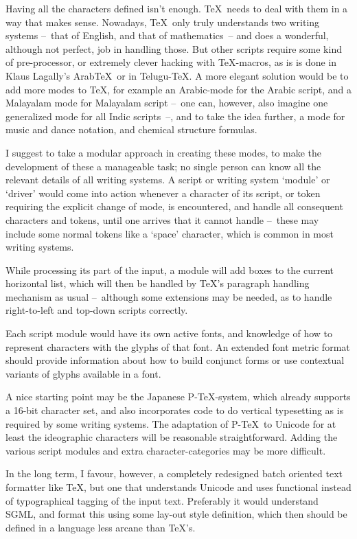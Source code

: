Having all the characters defined isn't enough. \TeX\ needs to deal
with them in a way that makes sense. Nowadays, \TeX\ only truly
understands two writing systems --~that of English, and that of
mathematics~-- and does a wonderful, although not perfect, job in
handling those. But other scripts require some kind of pre-processor,
or extremely clever hacking with \TeX-macros, as is is done in Klaus
Lagally's Arab\TeX\ or in Telugu-\TeX. A more elegant solution would
be to add more modes to \TeX, for example an Arabic-mode for the
Arabic script, and a Malayalam mode for Malayalam script --~one can,
however, also imagine one generalized mode for all Indic scripts~--,
and to take the idea further, a mode for music and dance notation, and
chemical structure formulas.

I suggest to take a modular approach in creating these modes, to make
the development of these a manageable task; no single person can know
all the relevant details of all writing systems. A script or writing
system `module' or `driver' would come into action whenever a
character of its script, or token requiring the explicit change of
mode, is encountered, and handle all consequent characters and tokens,
until one arrives that it cannot handle --~these may include some
normal tokens like a `space' character, which is common in most
writing systems.

While processing its part of the input, a module will add boxes to the
current horizontal list, which will then be handled by \TeX's
paragraph handling mechanism as usual --~although some extensions may
be needed, as to handle right-to-left and top-down scripts correctly.

Each script module would have its own active fonts, and knowledge of
how to represent characters with the glyphs of that font. An extended
font metric format should provide information about how to build
conjunct forms or use contextual variants of glyphs available in a
font.

A nice starting point may be the Japanese P-\TeX-system, which already
supports a 16-bit character set, and also incorporates code to do
vertical typesetting as is required by some writing systems. The
adaptation of P-\TeX\ to Unicode for at least the ideographic
characters will be reasonable straightforward. Adding the various
script modules and extra character-categories may be more difficult.

In the long term, I favour, however, a completely redesigned batch
oriented text formatter like \TeX, but one that understands Unicode
and uses functional instead of typographical tagging of the input
text. Preferably it would understand SGML, and format this using some
lay-out style definition, which then should be defined in a language
less arcane than \TeX's.

